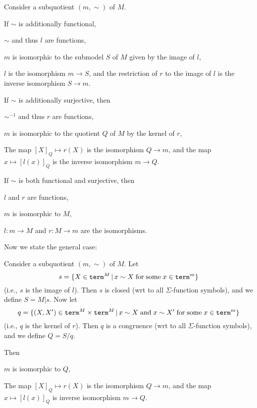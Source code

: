 \begin{theorem}
Consider a subquotient $(m,\sim)$ of $M$.

If $\sim$ is additionally functional,
\begin{compactitem}
 \item $\sim$ and thus $l$ are functions,
 \item $m$ is isomorphic to the submodel $S$ of $M$ given by the image of $l$,
 \item $l$ is the isomorphism $m\to S$, and the restriction of $r$ to the image of $l$ is the inverse isomorphism $S\to m$.
\end{compactitem}

If $\sim$ is additionally surjective, then
\begin{compactitem}
 \item $\sim^{-1}$ and thus $r$ are functions,
 \item $m$ is isomorphic to the quotient $Q$ of $M$ by the kernel of $r$,
 \item The map $[X]_Q\mapsto r(X)$ is the isomorphism $Q\to m$, and the map $x\mapsto [l(x)]_Q$ is the inverse isomorphism $m\to Q$.
\end{compactitem}

If $\sim$ is both functional and surjective, then
\begin{compactitem}
\item $l$ and $r$ are functions,
\item $m$ is isomorphic to $M$,
\item $l:m\to M$ and $r:M\to m$ are the isomorphisms.
\end{compactitem}
\end{theorem}

Now we state the general case:

\begin{theorem}
Consider a subquotient $(m,\sim)$ of $M$.
Let \[s=\{X\in\mathtt{term}^M \,|\, x\sim X\;\mathrm{for}\;\mathrm{some}\; x\in\mathtt{term}^m\}\] (i.e., $s$ is the image of $l$).
Then $s$ is closed (wrt to all $\Sigma$-function symbols), and we define $S=M|s$.
Now let \[q=\{(X,X')\in\mathtt{term}^M\times\mathtt{term}^M\,|\,x\sim X\;\mathrm{and}\; x\sim X'\;\mathrm{for}\;\mathrm{some}\; x\in\mathtt{term}^m\}\]
(i.e., $q$ is the kernel of $r$).
Then $q$ is a congruence (wrt to all $\Sigma$-function symbols), and we define $Q=S/q$.

Then
\begin{compactitem}
 \item $m$ is isomorphic to $Q$,
 \item The map $[X]_Q\mapsto r(X)$ is the isomorphism $Q\to m$, and the map $x\mapsto [l(x)]_Q$ is inverse isomorphism $m\to Q$.
\end{compactitem}
\end{theorem}


